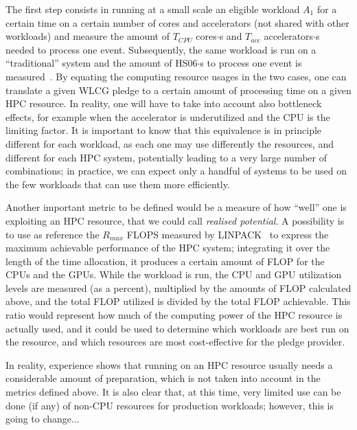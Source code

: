 The first step consists in running at a small scale an eligible
workload $A_1$ for a certain time on a certain number of cores and
accelerators (not shared with other workloads) and measure the amount
of $T_{CPU}$ cores$\cdot$s and $T_{acc}$ accelerators$\cdot$s needed
to process one event. Subsequently, the same workload is run on a
``traditional'' system and the amount of HS06$\cdot$s to process one
event is measured~\cite{hs06}. By equating the computing resource
usages in the two cases, one can translate a given WLCG pledge to a
certain amount of processing time on a given HPC resource. In reality,
one will have to take into account also bottleneck effects, for
example when the accelerator is underutilized and the CPU is the
limiting factor. It is important to know that this equivalence is in
principle different for each workload, as each one may use differently
the resources, and different for each HPC system, potentially leading
to a very large number of combinations; in practice, we can expect
only a handful of systems to be used on the few workloads that can use
them more efficiently.

Another important metric to be defined would be a measure of how
``well'' one is exploiting an HPC resource, that we could call
\emph{realised potential}. A possibility is to use as reference the
$R_{max}$ FLOPS measured by LINPACK~\cite{linpack} to express the
maximum achievable performance of the HPC system; integrating it over
the length of the time allocation, it produces a certain amount of
FLOP for the CPUs and the GPUs. While the workload is run, the CPU and
GPU utilization levels are measured (as a percent), multiplied by the
amounts of FLOP calculated above, and the total FLOP utilized is
divided by the total FLOP achievable. This ratio would represent how
much of the computing power of the HPC resource is actually used, and
it could be used to determine which workloads are best run on the
resource, and which resources are most cost-effective for the pledge
provider.

In reality, experience shows that running on an HPC resource usually
needs a considerable amount of preparation, which is not taken into
account in the metrics defined above. It is also clear that, at this
time, very limited use can be done (if any) of non-CPU resources for
production workloads; however, this is going to change...
